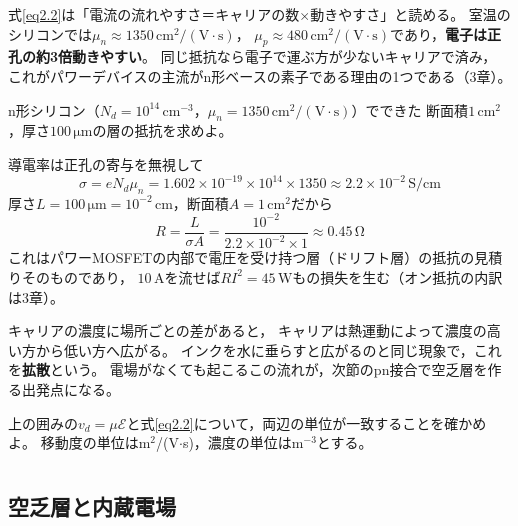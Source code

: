 式\ref{eq2.2}は「電流の流れやすさ＝キャリアの数$\times$動きやすさ」と読める。
室温のシリコンでは$\mu_n \approx 1350\,\mathrm{cm^2/(V\cdot s)}$，
$\mu_p \approx 480\,\mathrm{cm^2/(V\cdot s)}$であり，\textbf{電子は正孔の約3倍動きやすい}。
同じ抵抗なら電子で運ぶ方が少ないキャリアで済み，
これがパワーデバイスの主流がn形ベースの素子である理由の1つである（3章）。

\begin{例題}[ドリフト層の抵抗]
\label{rei2.1}
n形シリコン（$N_d = 10^{14}\,\mathrm{cm^{-3}}$，$\mu_n = 1350\,\mathrm{cm^2/(V\cdot s)}$）でできた
断面積$1\,\mathrm{cm^2}$，厚さ$100\,\mathrm{\mu m}$の層の抵抗を求めよ。
\begin{解答}
導電率は正孔の寄与を無視して
\begin{equation*}
\sigma = e N_d \mu_n = 1.602\times10^{-19} \times 10^{14} \times 1350
\approx 2.2\times10^{-2}\,\mathrm{S/cm}
\end{equation*}
厚さ$L = 100\,\mathrm{\mu m} = 10^{-2}$\,cm，断面積$A = 1\,\mathrm{cm^2}$だから
\begin{equation*}
R = \frac{L}{\sigma A} = \frac{10^{-2}}{2.2\times10^{-2} \times 1} \approx 0.45\,\mathrm{\Omega}
\end{equation*}
これはパワーMOSFETの内部で電圧を受け持つ層（ドリフト層）の抵抗の見積りそのものであり，
$10$\,Aを流せば$RI^2 = 45$\,Wもの損失を生む（オン抵抗の内訳は3章）。
\end{解答}
\end{例題}

キャリアの濃度に場所ごとの差があると，
キャリアは熱運動によって濃度の高い方から低い方へ広がる。
インクを水に垂らすと広がるのと同じ現象で，これを\textbf{拡散}という。
電場がなくても起こるこの流れが，次節のpn接合で空乏層を作る出発点になる。

\begin{問}
\item 上の囲みの$v_d = \mu\mathcal{E}$と式\ref{eq2.2}について，両辺の単位が一致することを確かめよ。
移動度の単位はm$^2$/(V$\cdot$s)，濃度の単位はm$^{-3}$とする。
\end{問}

\section{}
\label{sec2.4}

\subsection{空乏層と内蔵電場}

